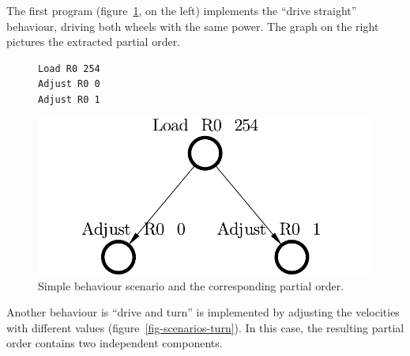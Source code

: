 The first program (figure~\ref{fig-scenarios-drive-straight}, on the left) implements
the ``drive straight'' behaviour, driving both wheels with the same power.
The graph on the right pictures the extracted partial order.

\begin{figure}
\vspace{-5mm}
\centering
  \begin{minipage}[b]{0.5\textwidth}
\begin{verbatim}
Load R0 254
Adjust R0 0
Adjust R0 1
\end{verbatim}
\vspace{5mm}
\end{minipage}
\begin{minipage}[b]{0.4\textwidth}
\includegraphics[scale=0.35]{img/ataed-scenario-drive-straight.pdf}
\end{minipage}
\caption{Simple behaviour scenario and the corresponding
partial order.\label{fig-scenarios-drive-straight}}
\end{figure}

Another behaviour is ``drive and turn'' is implemented by adjusting the velocities
with different values (figure~\ref{fig-scenarios-turn}). In this case, the
resulting partial order contains two independent components.

